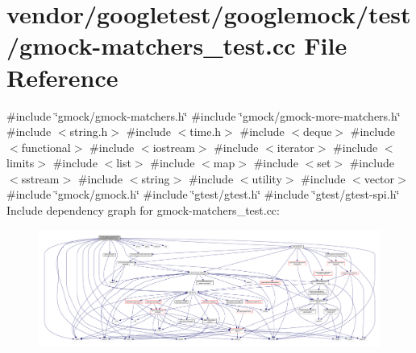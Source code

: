 \hypertarget{gmock-matchers__test_8cc}{}\section{vendor/googletest/googlemock/test/gmock-\/matchers\+\_\+test.cc File Reference}
\label{gmock-matchers__test_8cc}
{\ttfamily \#include \char`\"{}gmock/gmock-\/matchers.\+h\char`\"{}}\newline
{\ttfamily \#include \char`\"{}gmock/gmock-\/more-\/matchers.\+h\char`\"{}}\newline
{\ttfamily \#include $<$string.\+h$>$}\newline
{\ttfamily \#include $<$time.\+h$>$}\newline
{\ttfamily \#include $<$deque$>$}\newline
{\ttfamily \#include $<$functional$>$}\newline
{\ttfamily \#include $<$iostream$>$}\newline
{\ttfamily \#include $<$iterator$>$}\newline
{\ttfamily \#include $<$limits$>$}\newline
{\ttfamily \#include $<$list$>$}\newline
{\ttfamily \#include $<$map$>$}\newline
{\ttfamily \#include $<$set$>$}\newline
{\ttfamily \#include $<$sstream$>$}\newline
{\ttfamily \#include $<$string$>$}\newline
{\ttfamily \#include $<$utility$>$}\newline
{\ttfamily \#include $<$vector$>$}\newline
{\ttfamily \#include \char`\"{}gmock/gmock.\+h\char`\"{}}\newline
{\ttfamily \#include \char`\"{}gtest/gtest.\+h\char`\"{}}\newline
{\ttfamily \#include \char`\"{}gtest/gtest-\/spi.\+h\char`\"{}}\newline
Include dependency graph for gmock-\/matchers\+\_\+test.cc\+:
\nopagebreak
\begin{figure}[H]
\begin{center}
\leavevmode
\includegraphics[width=350pt]{gmock-matchers__test_8cc__incl}
\end{center}
\end{figure}
